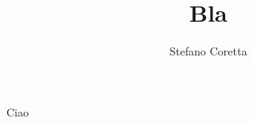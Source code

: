 \documentclass[11pt,a4paper]{memoir}
\title{Bla}
\author{Stefano Coretta}
\begin{document}
\begin{titlingpage}
\maketitle
\end{titlingpage}


Ciao
\end{document}
